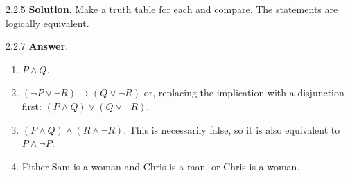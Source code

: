 \documentclass[11pt,]{book}
\theoremstyle{ptxplainnotitle}
\theoremstyle{ptxplaintitle}
\theoremstyle{ptxdefinitionnotitle}
\theoremstyle{ptxdefinitiontitle}
\theoremstyle{ptxdefinitionnotitle}
\theoremstyle{ptxdefinitiontitle}
\theoremstyle{ptxdefinitionnotitle}
\theoremstyle{ptxdefinitiontitle}
\theoremstyle{ptxdefinitiontitlenonumber}
\theoremstyle{ptxdefinitiontitlenonumber}
\numberwithin{equation}{chapter}
\newcommand{\imp}{\rightarrow}
\begin{document}
\begin{divisionexercise}{2.2.5}
\textbf{Solution}.\quad%
\hypertarget{p-2450}{}%
Make a truth table for each and compare. The statements are logically equivalent.%
\end{divisionexercise}%
\begin{divisionexercise}{2.2.7}
\textbf{Answer}.\quad%
\hypertarget{p-2455}{}%
\leavevmode%
\begin{enumerate}[label=(\alph*)]
\item\hypertarget{li-1255}{}\(P \wedge Q\).%
\item\hypertarget{li-1256}{}\((\neg P \vee \neg R) \imp (Q \vee \neg R)\) or, replacing the implication with a disjunction first: \((P \wedge Q) \vee (Q \vee \neg R)\).%
\item\hypertarget{li-1257}{}\hypertarget{p-2456}{}%
\((P \wedge Q) \wedge (R \wedge \neg R)\). This is necessarily false, so it is also equivalent to \(P \wedge \neg P\).%
\item\hypertarget{li-1258}{}\hypertarget{p-2457}{}%
Either Sam is a woman and Chris is a man, or Chris is a woman.%
\end{enumerate}
%
\end{divisionexercise}%
\end{document}
